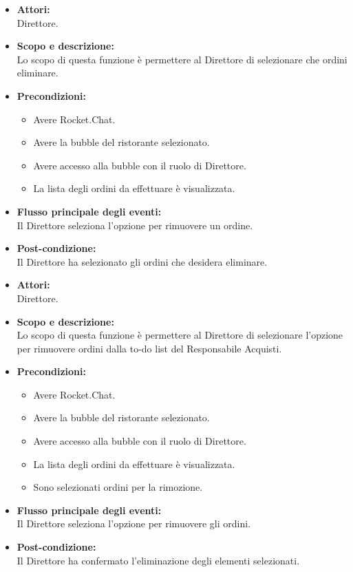 
\begin{itemize}
	\item \textbf{Attori:}
	\\Direttore.
	\item \textbf{Scopo e descrizione:} 
	\\Lo scopo di questa funzione è permettere al Direttore di selezionare che ordini eliminare.
	\item \textbf{Precondizioni:}
	\begin{itemize}
		\item Avere Rocket.Chat.
		\item Avere la bubble del ristorante selezionato.
		\item Avere accesso alla bubble con il ruolo di Direttore.
		\item La lista degli ordini da effettuare è visualizzata.
	\end{itemize}
	\item \textbf{Flusso principale degli eventi:}
	\\Il Direttore seleziona l'opzione per rimuovere un ordine.
	\item \textbf{Post-condizione:}
	\\Il Direttore ha selezionato gli ordini che desidera eliminare.
\end{itemize}


\begin{itemize}
	\item \textbf{Attori:}
	\\Direttore.
	\item \textbf{Scopo e descrizione:} 
	\\Lo scopo di questa funzione è permettere al Direttore di selezionare l'opzione per rimuovere ordini dalla to-do list del Responsabile Acquisti.
	\item \textbf{Precondizioni:}
	\begin{itemize}
		\item Avere Rocket.Chat.
		\item Avere la bubble del ristorante selezionato.
		\item Avere accesso alla bubble con il ruolo di Direttore.
		\item La lista degli ordini da effettuare è visualizzata.
		\item Sono selezionati ordini per la rimozione.
	\end{itemize}
	\item \textbf{Flusso principale degli eventi:}
	\\Il Direttore seleziona l'opzione per rimuovere gli ordini.
	\item \textbf{Post-condizione:}
	\\Il Direttore ha confermato l'eliminazione degli elementi selezionati.
\end{itemize}

